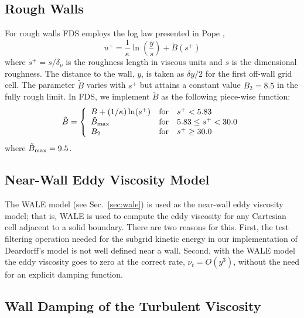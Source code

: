 \subsection{Rough Walls}
\label{rough_wall_model}

For rough walls FDS employs the log law presented in Pope \cite{Pope:2000},
\begin{equation}
\label{eqn_roughwallloglaw}
u^+ = \frac{1}{\kappa} \ln \left(\frac{y}{s}\right) + \tilde{B}(s^+)
\end{equation}
where $s^+ = s/\delta_\nu$ is the roughness length in viscous units and $s$ is the dimensional roughness. The distance to the wall, $y$, is taken as $\delta y/2$ for the first off-wall grid cell.  The parameter $\tilde{B}$ varies with $s^+$ but attains a constant value $B_2=8.5$ in the fully rough limit.  In FDS, we implement $\tilde{B}$ as the following piece-wise function:
\begin{equation}
\tilde{B} = \left\{ \begin{array}{lll} B + (1/\kappa)\ln(s^+)  & \mbox{for} &          s^+ < 5.83 \\
                                       \tilde{B}_{\rm max}     & \mbox{for} & 5.83 \le s^+ < 30.0 \\
                                       B_2                     & \mbox{for} &          s^+ \ge 30.0 \end{array} \right.
\end{equation}
where $\tilde{B}_{\rm max} = 9.5$.


\subsection{Near-Wall Eddy Viscosity Model}
\label{sec:wall_wale_model}

The WALE model (see Sec.~\ref{sec:wale}) is used as the near-wall eddy viscosity model; that is, WALE is used to compute the eddy viscosity for any Cartesian cell adjacent to a solid boundary.  There are two reasons for this.  First, the test filtering operation needed for the subgrid kinetic energy in our implementation of Deardorff's model is not well defined near a wall.  Second, with the WALE model the eddy viscosity goes to zero at the correct rate, $\nu_t = O(y^3)$, without the need for an explicit damping function.

\subsection{Wall Damping of the Turbulent Viscosity}
\label{sec:wall_damping}

